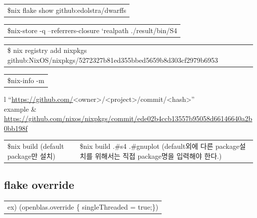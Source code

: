 \documentclass[11pt]{article}
\begin{document}
\begin{center}
\begin{tabular}{l}
\$nix flake show github:edolstra/dwarffs\\
\end{tabular}
\end{center}

\begin{center}
\begin{tabular}{l}
\$nix-store -q --referrers-closure `realpath ./result/bin/S4\\
\end{tabular}
\end{center}

\begin{center}
\begin{tabular}{l}
\$ nix registry add nixpkgs github:NixOS/nixpkgs/5272327b81ed355bbed5659b8d303cf2979b6953\\
\end{tabular}
\end{center}

\begin{center}
\begin{tabular}{l}
\$nix-info -m\\
\end{tabular}
\end{center}

\begin{center}
\begin{tabular}{l}
``\url{https://github.com/}<owner>/<project>/commit/<hash>''\\
example & \url{https://github.com/nixos/nixpkgs/commit/ede02b4ccb13557b95058d66146640a2b0bb198f}\\
\end{tabular}
\end{center}

\begin{center}
\begin{tabular}{ll}
\$nix build   (default package만 설치) & \$nix build .\#s4 .\#gnuplot (default외에 다른 package설치를 위해서는 직접 package명을 입력해야 한다.)\\
\end{tabular}
\end{center}

\subsection{flake override}
\label{sec:orgb32936d}
\begin{center}
\begin{tabular}{l}
ex) (openblas.override \{ singleThreaded = true;\})\\
\end{tabular}
\end{center}
\end{document}
